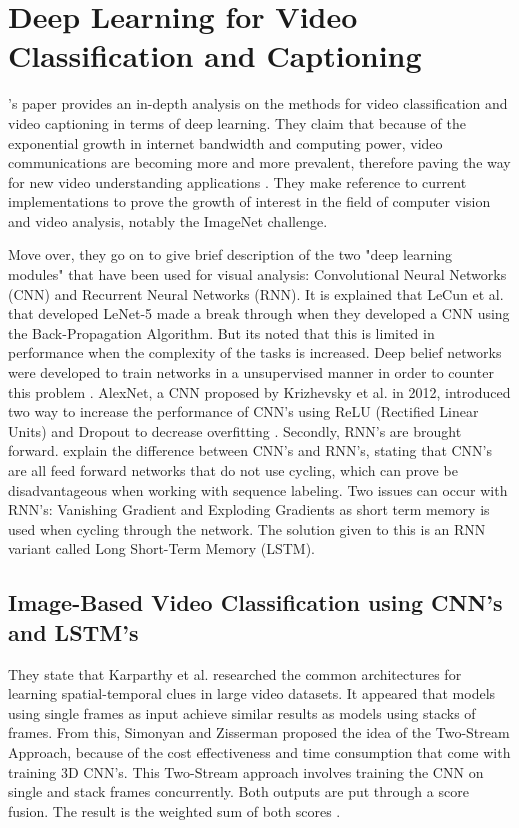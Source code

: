 \section{Deep Learning for Video Classiﬁcation and Captioning}
\citeauthor{Wu}'s paper provides an in-depth analysis on the methods for video classification and video captioning in terms of deep learning. They claim that because of the exponential growth in internet bandwidth and computing power, video communications are becoming more and more prevalent, therefore paving the way for new video understanding applications \citep{Wu}. They make reference to current implementations to prove the growth of interest in the field of computer vision and video analysis, notably the ImageNet challenge. 

Move over, they go on to give brief description of the two "deep learning modules" that have been used for visual analysis: Convolutional Neural Networks (CNN) and Recurrent Neural Networks (RNN). It is explained that LeCun et al. that developed LeNet-5 made a break through when they developed a CNN using the Back-Propagation Algorithm. But its noted that this is limited in performance when the complexity of the tasks is increased. Deep belief networks were developed to train networks in a unsupervised manner in order to counter this problem \citep{Wu}. AlexNet, a CNN proposed by Krizhevsky et al. in 2012, introduced two way to increase the performance of CNN's using ReLU (Rectified Linear Units) and Dropout to decrease overfitting \citep{Wu}. Secondly, RNN's are brought forward. \citeauthor{Wu} explain the difference between CNN's and RNN's, stating that CNN's are all feed forward networks that do not use cycling, which can prove be disadvantageous when working with sequence labeling. Two issues can occur with RNN's: Vanishing Gradient and Exploding Gradients as short term memory is used when cycling through the network. The solution given to this is an RNN variant called Long Short-Term Memory (LSTM). \\
\subsection{Image-Based Video Classiﬁcation using CNN's and LSTM's}
They state that  Karparthy et al. researched the common architectures for learning spatial-temporal clues in large video datasets. It appeared that models using single frames as input achieve similar results as models using stacks of frames. From this, Simonyan and Zisserman proposed the idea of the Two-Stream Approach, because of the cost effectiveness and time consumption that come with training 3D CNN's. This Two-Stream approach involves training the CNN on single and stack frames concurrently. Both outputs are put through a score fusion. The result is the weighted sum of both scores \citep{Wu}. 

